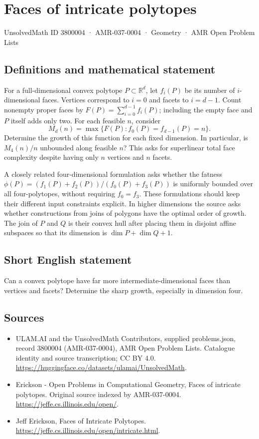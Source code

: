 \documentclass[11pt,a4paper]{article}
\begin{document}
\section*{Faces of intricate polytopes}\label{3800004}
{\small UnsolvedMath ID 3800004 · AMR-037-0004 · Geometry · AMR Open Problem Lists}
\subsection{Definitions and mathematical statement}
For a full-dimensional convex polytope $P\subset\mathbb R^d$, let $f_i(P)$
be its number of $i$-dimensional faces. Vertices correspond to $i=0$ and
facets to $i=d-1$. Count nonempty proper faces by
$F(P)=\sum_{i=0}^{d-1}f_i(P)$; including the empty face and $P$ itself adds
only two. For each feasible $n$, consider
\[
 M_d(n)=\max\{F(P):f_0(P)=f_{d-1}(P)=n\}.
\]
Determine the growth of this function for each fixed dimension. In
particular, is $M_4(n)/n$ unbounded along feasible $n$? This asks for
superlinear total face complexity despite having only $n$ vertices and
$n$ facets.

A closely related four-dimensional formulation asks whether the fatness
$\phi(P)=(f_1(P)+f_2(P))/(f_0(P)+f_3(P))$ is uniformly bounded over all
four-polytopes, without requiring $f_0=f_3$. These formulations should keep
their different input constraints explicit.
In higher dimensions the source asks whether constructions from joins of
polygons have the optimal order of growth. The join of $P$ and $Q$ is their
convex hull after placing them in disjoint affine subspaces so that its
dimension is $\dim P+\dim Q+1$.
\subsection{Short English statement}
Can a convex polytope have far more intermediate-dimensional faces than
vertices and facets? Determine the sharp growth, especially in dimension four.
\subsection{Sources}
\begin{itemize}
\item[S1] ULAM.AI and the UnsolvedMath Contributors, supplied problems.json, record 3800004 (AMR-037-0004), AMR Open Problem Lists. Catalogue identity and source transcription; CC BY 4.0.
\url{https://huggingface.co/datasets/ulamai/UnsolvedMath}.
\item[S2] Erickson - Open Problems in Computational Geometry, Faces of intricate polytopes. Original source indexed by AMR-037-0004.
\url{https://jeffe.cs.illinois.edu/open/}.
\item[S3] Jeff Erickson, Faces of Intricate Polytopes.
\url{https://jeffe.cs.illinois.edu/open/intricate.html}.
\end{itemize}
\end{document}

